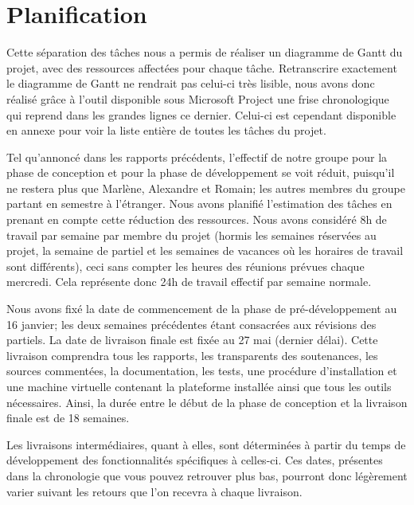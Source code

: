 \section{Planification}
\label{sec:chronologie}

	Cette séparation des tâches nous a permis de réaliser un diagramme de Gantt du projet, avec des ressources affectées pour chaque tâche. Retranscrire exactement le diagramme de Gantt ne rendrait pas celui-ci très lisible, nous avons donc réalisé grâce à l'outil disponible sous Microsoft Project une frise chronologique qui reprend dans les grandes lignes ce dernier. Celui-ci est cependant disponible en annexe pour voir la liste entière de toutes les tâches du projet.

	Tel qu'annoncé dans les rapports précédents, l'effectif de notre groupe pour la phase de conception et pour la phase de développement se voit réduit, puisqu'il ne restera plus que Marlène, Alexandre et Romain; les autres membres du groupe partant en semestre à l'étranger. Nous avons planifié l'estimation des tâches en prenant en compte cette réduction des ressources. Nous avons considéré 8h de travail par semaine par membre du projet (hormis les semaines réservées au projet, la semaine de partiel et les semaines de vacances où les horaires de travail sont différents), ceci sans compter les heures des réunions prévues chaque mercredi. Cela représente donc 24h de travail effectif par semaine normale.

	Nous avons fixé la date de commencement de la phase de pré-développement au 16 janvier; les deux semaines précédentes étant consacrées aux révisions des partiels. La date de livraison finale est fixée au 27 mai (dernier délai). Cette livraison comprendra tous les rapports, les transparents des soutenances, les sources commentées, la documentation, les tests, une procédure d'installation et une machine virtuelle contenant la plateforme installée ainsi que tous les outils nécessaires. Ainsi, la durée entre le début de la phase de conception et la livraison finale est de 18 semaines.

	Les livraisons intermédiaires, quant à elles, sont déterminées à partir du temps de développement des fonctionnalités spécifiques à celles-ci. Ces dates, présentes dans la chronologie que vous pouvez retrouver plus bas, pourront donc légèrement varier suivant les retours que l'on recevra à chaque livraison. 

